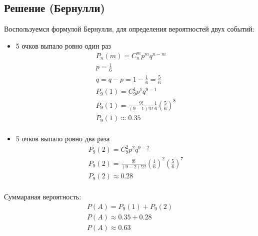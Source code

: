 \documentclass[12pt]{article}
\begin{document}
\subsection*{Решение (Бернулли)}
Воспользуемся формулой Бернулли, для определения вероятностей двух событий:
\begin{itemize}
	\item 5 очков выпало ровно один раз \\
	      \begin{gather*}
		      P_n(m) = C_n^mp^mq^{n-m} \\
		      p = \frac{1}{6} \\
		      q = q - p = 1 - \frac{1}{6} = \frac{5}{6} \\
		      P_9(1) = C_9^1p^1q^{9-1} \\
		      P_9(1) = \frac{9!}{(9 - 1)!1!}\frac{1}{6}\left(\frac{5}{6}\right)^8 \\
		      P_9(1) \approx 0.35 \\
	      \end{gather*}
	\item 5 очков выпало ровно два раза \\
	      \begin{gather*}
		      P_9(2) = C_9^2p^2q^{9-2} \\
		      P_9(2) = \frac{9!}{(9 - 2)!2!}\left(\frac{1}{6}\right)^2\left(\frac{5}{6}\right)^7 \\
		      P_9(2) \approx 0.28 \\
	      \end{gather*}
\end{itemize}

Суммараная вероятность:
\begin{gather*}
	P(A) = P_9(1) + P_9(2) \\
	P(A) \approx 0.35 + 0.28 \\
	P(A) \approx 0.63 \\
\end{gather*}
\end{document}

